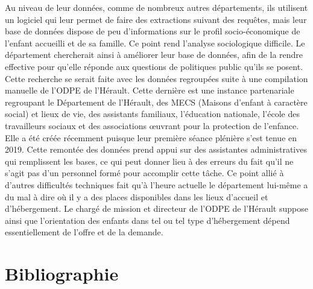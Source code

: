 \documentclass[
  12,
  a4paper,
]{report}
\newlength{\cslhangindent}
\newlength{\cslentryspacingunit} %
\newenvironment{CSLReferences}[2] %
 {%
  \setlength{\parindent}{0pt}
  \ifodd #1
  \let\oldpar\par
  \def\par{\hangindent=\cslhangindent\oldpar}
  \fi
  \setlength{\parskip}{#2\cslentryspacingunit}
 }%
 {}
\begin{document}
\begin{mdframed}[frametitle= Exemple d'une rencontre avec un chargé de mission de la direction enfance et famille et de l'ODPE du département de l'Hérault]
Au niveau de leur données, comme de nombreux autres départements, ils utilisent un logiciel qui leur permet de faire des extractions suivant des requêtes, mais leur base de données dispose de peu d'informations sur le profil socio-économique de l'enfant accueilli et de sa famille. Ce point rend l'analyse sociologique difficile. Le département chercherait ainsi à améliorer leur base de données, afin de la rendre effective pour qu'elle réponde aux questions de politiques public qu'ils se posent. Cette recherche se serait faite avec les données regroupées suite à une compilation manuelle de l'ODPE de l'Hérault. Cette dernière est une instance partenariale regroupant le Département de l'Hérault, des MECS (Maisons d'enfant à caractère social) et lieux de vie, des assistants familiaux, l'éducation nationale, l'école des travailleurs sociaux et des associations œuvrant pour la protection de l'enfance. Elle a été créée récemment puisque leur première séance plénière s'est tenue en 2019. Cette remontée des données prend appui sur des assistantes administratives qui remplissent les bases, ce qui peut donner lieu à des erreurs du fait qu'il ne s'agit pas d'un personnel formé pour accomplir cette tâche. Ce point allié à d'autres difficultés techniques fait qu'à l'heure actuelle le département lui-même a du mal à dire où il y a des places disponibles dans les lieux d'accueil et d'hébergement. Le chargé de mission et directeur de l'ODPE de l'Hérault suppose ainsi que l'orientation des enfants dans tel ou tel type d'hébergement dépend essentiellement de l'offre et de la demande.

\end{mdframed}

\newpage
\singlespacing
\setlength{\parskip}{0.5em}

{}
\section*{Bibliographie}

\hypertarget{refs}{}
\begin{CSLReferences}{0}{0}
\end{CSLReferences}
\end{document}

